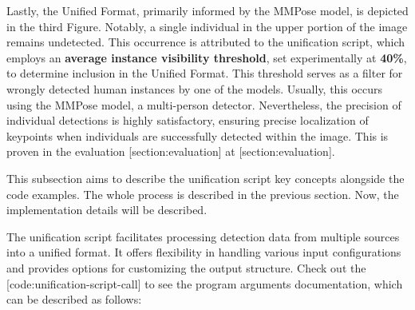 Lastly, the Unified Format, primarily informed by the MMPose model, is depicted in the third Figure. Notably, a single individual in the upper portion of the image remains undetected. This occurrence is attributed to the unification script, which employs an {\bf average instance visibility threshold}, set experimentally at {\bf 40\%}, to determine inclusion in the Unified Format. This threshold serves as a filter for wrongly detected human instances by one of the models. Usually, this occurs using the MMPose model, a multi-person detector. Nevertheless, the precision of individual detections is highly satisfactory, ensuring precise localization of keypoints when individuals are successfully detected within the image. This is proven in the evaluation [section:evaluation] at [section:evaluation].

This subsection aims to describe the unification script key concepts alongside the code examples. The whole process is described in the previous section. Now, the implementation details will be described.


The unification script facilitates processing detection data from multiple sources into a unified format. It offers flexibility in handling various input configurations and provides options for customizing the output structure. Check out the [code:unification-script-call] to see the program arguments documentation, which can be described as follows:

